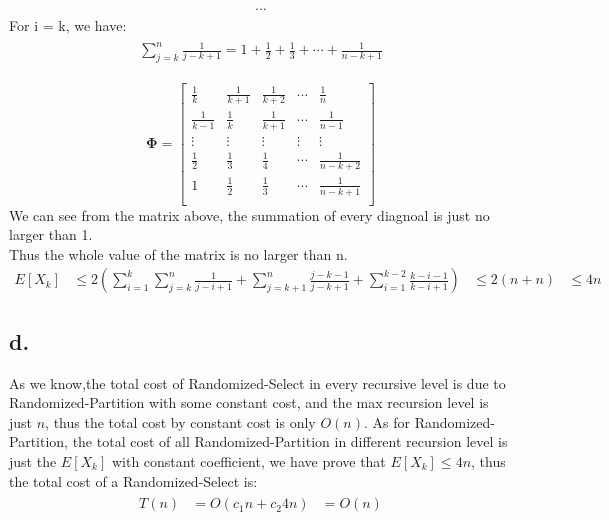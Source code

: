 \documentclass[oneside]{homework} %
\begin{document}
\begin{eqnarray*}
  \cdots
\end{eqnarray*}
For  i = k, we have:
\begin{eqnarray}
  \begin{split}
	\sum_{j = k}^n \frac{1}{j-k+1} = 1 + \frac{1}{2} + \frac{1}{3} + \cdots + \frac{1}{n-k+1}
  \end{split}
\end{eqnarray}

\begin{equation}
  \mathbf{\Phi}=\left[
 \begin{array}{ccccc}
   \frac{1}{k} & \frac{1}{k+1}	& \frac{1}{k+2} & \cdots & \frac{1}{n} \\
   \frac{1}{k-1} & \frac{1}{k}	& \frac{1}{k+1} & \cdots & \frac{1}{n-1} \\
  \vdots & \vdots & \vdots & \vdots & \vdots \\
   \frac{1}{2} & \frac{1}{3}	& \frac{1}{4} & \cdots & \frac{1}{n-k+2} \\
   1 & \frac{1}{2}	& \frac{1}{3} & \cdots & \frac{1}{n-k+1} \\
\end{array}
\right]
\label{equ:Gmatrixnumber}
\end{equation}
We can see from the matrix above, the summation of every diagnoal is just no larger than 1. \\
Thus the whole value of the matrix is no larger than n.
\\
\begin{equation} 
  \begin{aligned}
	E[X_k] 	  &\leq 2(\sum_{i = 1}^k \sum_{j = k}^n \frac{1}{j - i + 1} + \sum_{j = k + 1}^{n} \frac{j - k - 1}{j - k + 1} + \sum_{i = 1}^{k - 2} \frac{k - i - 1}{k - i + 1})
	  &\leq 2(n +n)
	  &\leq 4n
  \end{aligned}
  \label{equ:f}
\end{equation}

\subsection* {d.}
As we know,the total cost of Randomized-Select in every recursive level is due to Randomized-Partition with some constant cost, and the max recursion level is just $n$, thus the total cost by constant cost is only $O(n)$.
As for Randomized-Partition, the total cost of all Randomized-Partition in different recursion level is just the $E[X_{k}]$ with constant coefficient, we have prove that 
$E[X_{k}] \leq 4n$, thus the total cost of a Randomized-Select is:
\begin{eqnarray}
  \begin{split}
	T(n) &= O(c_{1}n + c_{2}4n)
	 &= O(n)
  \end{split}
\end{eqnarray}
\end{document}
